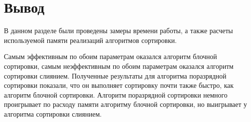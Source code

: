 \section*{Вывод}

В данном разделе были проведены замеры времени работы, а также расчеты используемой памяти реализаций алгоритмов сортировки. 

Самым эффективным по обоим параметрам оказался алгоритм блочной сортировки, самым неэффективным по обоим параметрам оказался алгоритм сортировки слиянием. Полученные результаты для алгоритма поразрядной сортировки показали, что он выполняет сортировку почти также быстро, как алгоритм блочной сортировки. Алгоритм поразрядной сортировки немного проигрывает по расходу памяти алгоритму блочной сортировки, но выигрывает у алгоритма сортировки слиянием.

